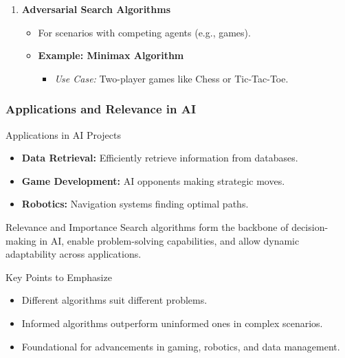\documentclass[aspectratio=169]{beamer}
\begin{document}
\begin{frame}[fragile]
\begin{enumerate}
        \item \textbf{Adversarial Search Algorithms}
        \begin{itemize}
            \item For scenarios with competing agents (e.g., games).
            \item \textbf{Example: Minimax Algorithm}
                \begin{itemize}
                    \item \textit{Use Case:} Two-player games like Chess or Tic-Tac-Toe.
                \end{itemize}
        \end{itemize}
    \end{enumerate}
\end{frame}

\begin{frame}[fragile]
    \frametitle{Applications and Relevance in AI}
    \begin{block}{Applications in AI Projects}
        \begin{itemize}
            \item \textbf{Data Retrieval:} Efficiently retrieve information from databases.
            \item \textbf{Game Development:} AI opponents making strategic moves.
            \item \textbf{Robotics:} Navigation systems finding optimal paths.
        \end{itemize}
    \end{block}
    
    \begin{block}{Relevance and Importance}
        Search algorithms form the backbone of decision-making in AI, enable problem-solving capabilities, and allow dynamic adaptability across applications.
    \end{block}
    
    \begin{block}{Key Points to Emphasize}
        \begin{itemize}
            \item Different algorithms suit different problems.
            \item Informed algorithms outperform uninformed ones in complex scenarios.
            \item Foundational for advancements in gaming, robotics, and data management.
        \end{itemize}
    \end{block}
\end{frame}
\end{document}
